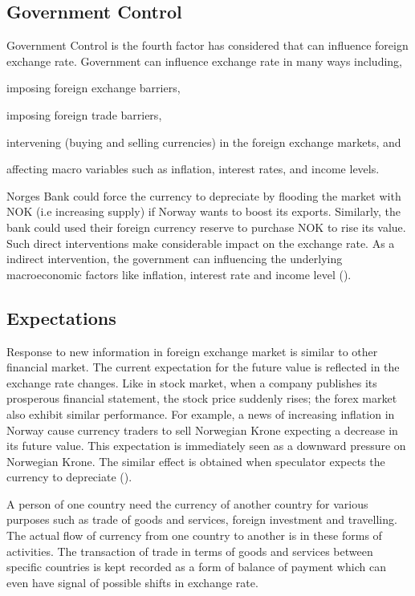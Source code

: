 \documentclass[12pt, lot, lof]{thesis}\usepackage[]{graphicx}\usepackage[]{color}
\begin{document}
\subsection{Government Control}
\label{ssec:govControl}

Government Control is the fourth factor \citet{madura2012international} has considered that can influence foreign exchange rate. Government can influence exchange rate in many ways including, 
\begin{inlinelist}
    \item imposing foreign exchange barriers, 
    \item imposing foreign trade barriers, 
    \item intervening (buying and selling currencies) in the foreign exchange markets, and 
    \item affecting macro variables such as inflation, interest rates, and income levels.
\end{inlinelist}
Norges Bank could force the currency to depreciate by flooding the market with NOK (i.e increasing supply) if Norway wants to boost its exports. Similarly, the bank could used their foreign currency reserve to purchase NOK to rise its value. Such direct interventions make considerable impact on the exchange rate. As a indirect intervention, the government can influencing the underlying macroeconomic factors like inflation, interest rate and income level (\cite[p.~107]{madura2012international}). 

\subsection{Expectations}
\label{ssec:expectations}

Response to new information in foreign exchange market is similar to other financial market. The current expectation for the future value is reflected in the exchange rate changes. Like in stock market, when a company publishes its prosperous financial statement, the stock price suddenly rises; the forex market also exhibit similar performance. For example, a news of increasing inflation in Norway cause currency traders to sell Norwegian Krone expecting a decrease in its future value. This expectation is immediately seen as a downward pressure on Norwegian Krone. The similar effect is obtained when speculator expects the currency to depreciate (\cite[p.~107]{madura2012international}).

A person of one country need the currency of another country for various purposes such as trade of goods and services, foreign investment and travelling. The actual flow of currency from one country to another is in these forms of activities. The transaction of trade in terms of goods and services between specific countries is kept recorded as a form of balance of payment which can even have signal of possible shifts in exchange rate.
\end{document}

